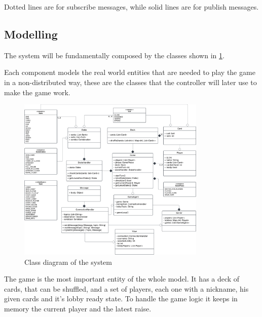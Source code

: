 \documentclass{scrartcl}
\begin{document}
Dotted lines are for subscribe messages, while solid lines are for publish messages. \newline

\subsection{Modelling}\label{modelling}

The system will be fundamentally composed by the classes shown in \cref{fig:classes}.

Each component models the real world entities that are needed to play the game in a non-distributed
way, these are the classes that the controller will later use to make the game work.
\begin{figure}[H]
      \centering
      \includegraphics[width=0.8\textwidth]{figures/classes.png}
      \caption{Class diagram of the system}
      \label{fig:classes}
\end{figure}

The game is the most important entity of the whole model. It has a deck of cards, that can be shuffled,
and a set of players, each one with a nickname, his given cards and it's lobby ready state.
To handle the game logic it keeps in memory the current player and the latest raise.
\end{document}
